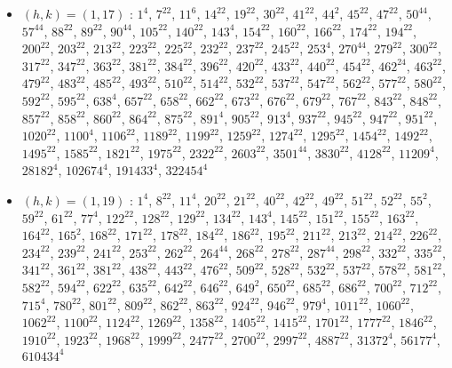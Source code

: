 \begin{itemize}
\item $(h,k)=(1,17)$ : $1^{4}$, $7^{22}$, $11^{6}$, $14^{22}$, $19^{22}$, $30^{22}$, $41^{22}$, $44^{2}$, $45^{22}$, $47^{22}$, $50^{44}$, $57^{44}$, $88^{22}$, $89^{22}$, $90^{44}$, $105^{22}$, $140^{22}$, $143^{4}$, $154^{22}$, $160^{22}$, $166^{22}$, $174^{22}$, $194^{22}$, $200^{22}$, $203^{22}$, $213^{22}$, $223^{22}$, $225^{22}$, $232^{22}$, $237^{22}$, $245^{22}$, $253^{4}$, $270^{44}$, $279^{22}$, $300^{22}$, $317^{22}$, $347^{22}$, $363^{22}$, $381^{22}$, $384^{22}$, $396^{22}$, $420^{22}$, $433^{22}$, $440^{22}$, $454^{22}$, $462^{24}$, $463^{22}$, $479^{22}$, $483^{22}$, $485^{22}$, $493^{22}$, $510^{22}$, $514^{22}$, $532^{22}$, $537^{22}$, $547^{22}$, $562^{22}$, $577^{22}$, $580^{22}$, $592^{22}$, $595^{22}$, $638^{4}$, $657^{22}$, $658^{22}$, $662^{22}$, $673^{22}$, $676^{22}$, $679^{22}$, $767^{22}$, $843^{22}$, $848^{22}$, $857^{22}$, $858^{22}$, $860^{22}$, $864^{22}$, $875^{22}$, $891^{4}$, $905^{22}$, $913^{4}$, $937^{22}$, $945^{22}$, $947^{22}$, $951^{22}$, $1020^{22}$, $1100^{4}$, $1106^{22}$, $1189^{22}$, $1199^{22}$, $1259^{22}$, $1274^{22}$, $1295^{22}$, $1454^{22}$, $1492^{22}$, $1495^{22}$, $1585^{22}$, $1821^{22}$, $1975^{22}$, $2322^{22}$, $2603^{22}$, $3501^{44}$, $3830^{22}$, $4128^{22}$, $11209^{4}$, $28182^{4}$, $102674^{4}$, $191433^{4}$, $322454^{4}$
\item $(h,k)=(1,19)$ : $1^{4}$, $8^{22}$, $11^{4}$, $20^{22}$, $21^{22}$, $40^{22}$, $42^{22}$, $49^{22}$, $51^{22}$, $52^{22}$, $55^{2}$, $59^{22}$, $61^{22}$, $77^{4}$, $122^{22}$, $128^{22}$, $129^{22}$, $134^{22}$, $143^{4}$, $145^{22}$, $151^{22}$, $155^{22}$, $163^{22}$, $164^{22}$, $165^{2}$, $168^{22}$, $171^{22}$, $178^{22}$, $184^{22}$, $186^{22}$, $195^{22}$, $211^{22}$, $213^{22}$, $214^{22}$, $226^{22}$, $234^{22}$, $239^{22}$, $241^{22}$, $253^{22}$, $262^{22}$, $264^{44}$, $268^{22}$, $278^{22}$, $287^{44}$, $298^{22}$, $332^{22}$, $335^{22}$, $341^{22}$, $361^{22}$, $381^{22}$, $438^{22}$, $443^{22}$, $476^{22}$, $509^{22}$, $528^{22}$, $532^{22}$, $537^{22}$, $578^{22}$, $581^{22}$, $582^{22}$, $594^{22}$, $622^{22}$, $635^{22}$, $642^{22}$, $646^{22}$, $649^{2}$, $650^{22}$, $685^{22}$, $686^{22}$, $700^{22}$, $712^{22}$, $715^{4}$, $780^{22}$, $801^{22}$, $809^{22}$, $862^{22}$, $863^{22}$, $924^{22}$, $946^{22}$, $979^{4}$, $1011^{22}$, $1060^{22}$, $1062^{22}$, $1100^{22}$, $1124^{22}$, $1269^{22}$, $1358^{22}$, $1405^{22}$, $1415^{22}$, $1701^{22}$, $1777^{22}$, $1846^{22}$, $1910^{22}$, $1923^{22}$, $1968^{22}$, $1999^{22}$, $2477^{22}$, $2700^{22}$, $2997^{22}$, $4887^{22}$, $31372^{4}$, $56177^{4}$, $610434^{4}$

\end{itemize}
